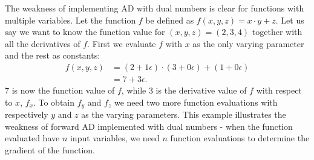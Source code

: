 The weakness of implementing AD with dual numbers is clear for functions with multiple variables. Let the function $f$ be defined as $f(x,y,z) = x\cdot y + z$. Let us say we want to know the function value for $(x,y,z) = (2,3,4)$ together with all the derivatives of $f$. First we evaluate $f$ with $x$ as the only varying parameter and the rest as constants:
\begin{align*}
    f(x,y,z) &= (2+1\epsilon)\cdot(3+0\epsilon) + (1+0\epsilon)\\
        &=7+3\epsilon.
\end{align*}
$7$ is now the function value of $f$, while $3$ is the derivative value of $f$ with respect to $x$, $f_x$. To obtain $f_y$ and $f_z$ we need two more function evaluations with respectively $y$ and $z$ as the varying parameters. This example illustrates the weakness of forward AD implemented with dual numbers - when the function evaluated have $n$ input variables, we need $n$ function evaluations to determine the gradient of the function.

